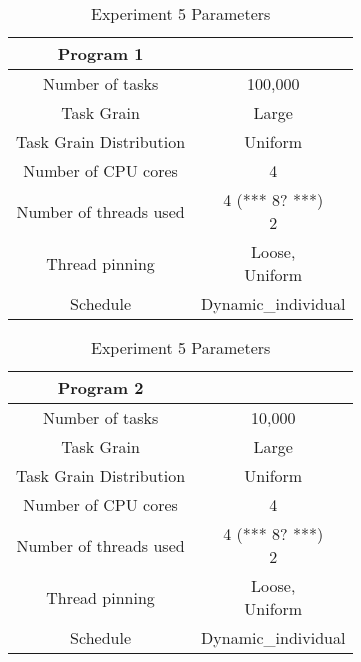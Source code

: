 \begin{table}
\centering
 \begin{tabular}{|c|c|}
  \hline
  Program 1 & \\
  \hline
  Number of tasks & 100,000 \\
  \hline
  Task Grain & Large \\
  \hline
  Task Grain Distribution & Uniform \\
  \hline
  Number of CPU cores & 4 \\
  \hline
  Number of threads used & \specialcell{4 (*** 8? ***)\\ 2} \\
  \hline
  Thread pinning & \specialcell{Loose, \\ Uniform} \\
  \hline
  Schedule & Dynamic\_individual \\
  \hline
 \end{tabular}

 \begin{tabular}{|c|c|}
  \hline
  Program 2 & \\
  \hline
  Number of tasks & 10,000 \\
  \hline
  Task Grain & Large \\
  \hline
  Task Grain Distribution & Uniform \\
  \hline
  Number of CPU cores & 4 \\
  \hline
  Number of threads used & \specialcell{4 (*** 8? ***)\\ 2} \\
  \hline
  Thread pinning & \specialcell{Loose, \\ Uniform} \\
  \hline
  Schedule & Dynamic\_individual \\
  \hline
 \end{tabular}
\caption{Experiment 5 Parameters}
\iflabele
\label{table:evaluation_ex5_parameters}
\fi
{}
\end{table}
